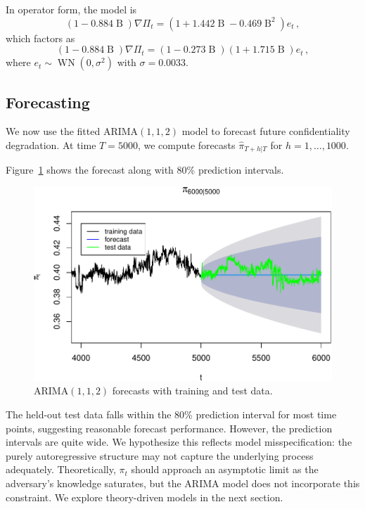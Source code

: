 \documentclass[final,11pt]{article}
\newcommand{\backshift}{\operatorname{B}}
\theoremstyle{plain}
\theoremstyle{remark}
\begin{document}
In operator form, the model is
\begin{equation}
  (1 - 0.884 \backshift) \nabla \Pi_t = (1 + 1.442 \backshift - 0.469 \backshift^2) e_t\,,
\end{equation}
which factors as
\begin{equation}
  (1 - 0.884 \backshift) \nabla \Pi_t = (1 - 0.273 \backshift) (1 + 1.715 \backshift) e_t\,,
\end{equation}
where $e_t \sim \operatorname{WN}(0, \sigma^2)$ with $\sigma = 0.0033$.

\hypertarget{forecasting}{%
\subsection{Forecasting}\label{forecasting}}

We now use the fitted ARIMA$(1,1,2)$ model to forecast future
confidentiality degradation. At time $T=5000$, we compute forecasts
$\hat{\pi}_{T+h|T}$ for $h = 1, \ldots, 1000$.

Figure~\ref{fig:forecast} shows the forecast along with 80\% prediction
intervals.

\begin{figure}
\includegraphics{paper_files/figure-latex/unnamed-chunk-16-1.pdf}
\caption{ARIMA$(1,1,2)$ forecasts with training and test data.}
\label{fig:forecast}
\end{figure}

The held-out test data falls within the 80\% prediction interval for most
time points, suggesting reasonable forecast performance. However, the
prediction intervals are quite wide. We hypothesize this reflects model
misspecification: the purely autoregressive structure may not capture the
underlying process adequately. Theoretically, $\pi_t$ should approach an
asymptotic limit as the adversary's knowledge saturates, but the ARIMA
model does not incorporate this constraint. We explore theory-driven models
in the next section.
\end{document}

